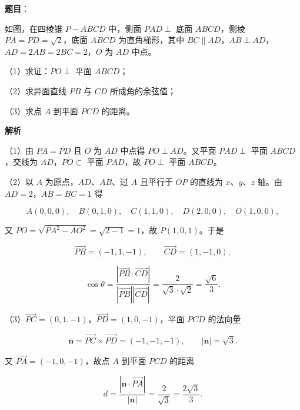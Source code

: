 \begin{answer}

\textbf{题目}：

如图，在四棱锥 $P-ABCD$ 中，侧面 $PAD\perp$ 底面 $ABCD$，侧棱 $PA=PD=\sqrt2$，底面 $ABCD$ 为直角梯形，其中 $BC\parallel AD$，$AB\perp AD$，$AD=2AB=2BC=2$，$O$ 为 $AD$ 中点。

（1）求证：$PO\perp$ 平面 $ABCD$；

（2）求异面直线 $PB$ 与 $CD$ 所成角的余弦值；

（3）求点 $A$ 到平面 $PCD$ 的距离。
\nopagebreak[4]
\begin{center}\end{center}
\nopagebreak[4]
\textbf{解析}

（1）由 $PA=PD$ 且 $O$ 为 $AD$ 中点得 $PO\perp AD$。又平面 $PAD\perp$ 平面 $ABCD$，交线为 $AD$，$PO\subset$ 平面 $PAD$，故 $PO\perp$ 平面 $ABCD$。

（2）以 $A$ 为原点，$AD$、$AB$、过 $A$ 且平行于 $OP$ 的直线为 $x$、$y$、$z$ 轴。由 $AD=2$，$AB=BC=1$ 得

\nopagebreak[4]
\[A(0,0,0),\quad B(0,1,0),\quad C(1,1,0),\quad D(2,0,0),\quad O(1,0,0),\]

又 $PO=\sqrt{PA^2-AO^2}=\sqrt{2-1}=1$，故 $P(1,0,1)$。于是

\nopagebreak[4]
\[\overrightarrow{PB}=(-1,1,-1),\qquad \overrightarrow{CD}=(1,-1,0),\]

\nopagebreak[4]
\[\cos\theta=\frac{|\overrightarrow{PB}\cdot\overrightarrow{CD}|}{|\overrightarrow{PB}||\overrightarrow{CD}|}=\frac2{\sqrt3\cdot\sqrt2}=\frac{\sqrt6}3.\]

（3）$\overrightarrow{PC}=(0,1,-1)$，$\overrightarrow{PD}=(1,0,-1)$，平面 $PCD$ 的法向量

\nopagebreak[4]
\[\boldsymbol n=\overrightarrow{PC}\times\overrightarrow{PD}=(-1,-1,-1),\qquad |\boldsymbol n|=\sqrt3.\]

又 $\overrightarrow{PA}=(-1,0,-1)$，故点 $A$ 到平面 $PCD$ 的距离

\nopagebreak[4]
\[d=\frac{|\boldsymbol n\cdot\overrightarrow{PA}|}{|\boldsymbol n|}=\frac2{\sqrt3}=\frac{2\sqrt3}3.\]


\end{answer}
